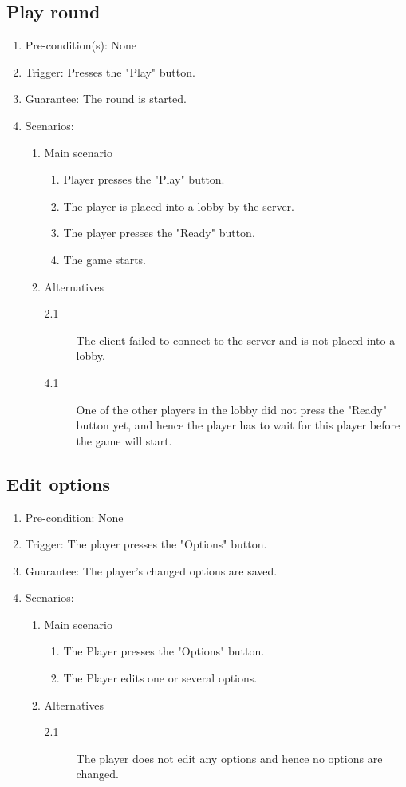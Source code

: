 \documentclass[a4paper,twoside,11pt]{article}
\begin{document}
\subsection*{Play round}
\begin{enumerate}
\item Pre-condition(s): None
\item Trigger: Presses the "Play" button.
\item Guarantee: The round is started.
\item Scenarios: 
	\begin{enumerate}
	\item Main scenario
		\begin{enumerate}[1)]
		\item Player presses the "Play" button.
		\item The player is placed into a lobby by the server.
		\item The player presses the "Ready" button.
		\item The game starts.
		\end{enumerate}
	\item Alternatives
		\begin{description}
		\item[2.1] The client failed to connect to the server and is 			not placed into a lobby.
		\item[4.1] One of the other players in the lobby did not press 			the "Ready" button yet, and hence the player has to wait for 			this player before the game will start.
		\end{description}
	\end{enumerate}
\end{enumerate}
\subsection*{Edit options}
\begin{enumerate}
\item Pre-condition: None
\item Trigger: The player presses the "Options" button.
\item Guarantee: The player's changed options are saved.
\item Scenarios: 
	\begin{enumerate}
	\item Main scenario
		\begin{enumerate}[1)]
		\item The Player presses the "Options" button.
		\item The Player edits one or several options.
		\end{enumerate}
	\item Alternatives
		\begin{description}
		\item[2.1] The player does not edit any options and hence no 			options are changed.
		\end{description}
	\end{enumerate}
\end{enumerate}
\end{document}
